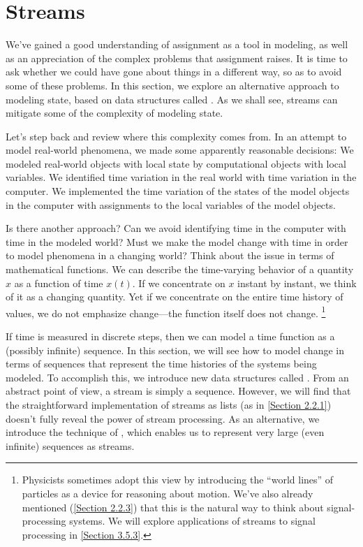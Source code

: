 \section{Streams}
\label{Section 3.5}

We’ve gained a good understanding of assignment as a tool in modeling, as well as an appreciation of the complex problems that assignment raises.
It is time to ask whether we could have gone about things in a different way, so as to avoid some of these problems.
In this section, we explore an alternative approach to modeling state, based on data structures called .
As we shall see, streams can mitigate some of the complexity of modeling state.

Let’s step back and review where this complexity comes from.
In an attempt to model real-world phenomena, we made some apparently reasonable decisions:
We modeled real-world objects with local state by computational objects with local variables.
We identified time variation in the real world with time variation in the computer.
We implemented the time variation of the states of the model objects in the computer with assignments to the local variables of the model objects.

Is there another approach?
Can we avoid identifying time in the computer with time in the modeled world?
Must we make the model change with time in order to model phenomena in a changing world?
Think about the issue in terms of mathematical functions.
We can describe the time-varying behavior of a quantity \( x \) as a function of time \( x(t) \).
If we concentrate on \( x \) instant by instant, we think of it as a changing quantity.
Yet if we concentrate on the entire time history of values, we do not emphasize change---the function itself does not change.%
\footnote{
	Physicists sometimes adopt this view by introducing the “world lines” of particles as a device for reasoning about motion.
	We’ve also already mentioned (\cref{Section 2.2.3}) that this is the natural way to think about signal-processing systems.
	We will explore applications of streams to signal processing in \cref{Section 3.5.3}.
}

If time is measured in discrete steps, then we can model a time function as a (possibly infinite) sequence.
In this section, we will see how to model change in terms of sequences that represent the time histories of the systems being modeled.
To accomplish this, we introduce new data structures called .
From an abstract point of view, a stream is simply a sequence.
However, we will find that the straightforward implementation of streams as lists (as in \cref{Section 2.2.1}) doesn’t fully reveal the power of stream processing.
As an alternative, we introduce the technique of , which enables us to represent very large (even infinite) sequences as streams.

